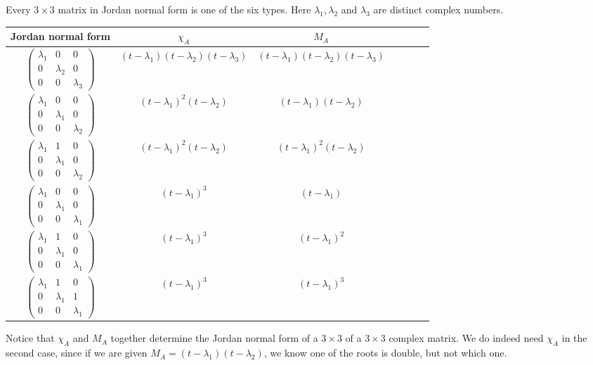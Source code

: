 \documentclass[a4paper]{article}
\begin{document}
\begin{eg}
  Every $3\times 3$ matrix in Jordan normal form is one of the six types. Here $\lambda_1, \lambda_2$ and $\lambda_3$ are distinct complex numbers.
  \begin{center}
    \begin{tabular}{ccccccc}
      \toprule
      Jordan normal form & $\chi_A$ & $M_A$\\
      \midrule
      $\begin{pmatrix} \lambda_1 & 0 & 0\\ 0 & \lambda_2 & 0\\ 0 & 0 & \lambda_3 \end{pmatrix}$ & $(t - \lambda_1)(t - \lambda_2)(t- \lambda_3)$ & $(t - \lambda_1)(t - \lambda_2)(t- \lambda_3)$\\\addlinespace
      $\begin{pmatrix} \lambda_1 & 0 & 0\\ 0 & \lambda_1 & 0\\ 0 & 0 & \lambda_2 \end{pmatrix}$ & $(t - \lambda_1)^2 (t - \lambda_2)$ & $(t - \lambda_1) (t - \lambda_2)$\\\addlinespace
      $\begin{pmatrix} \lambda_1 & 1 & 0\\ 0 & \lambda_1 & 0\\ 0 & 0 & \lambda_2 \end{pmatrix}$ & $(t - \lambda_1)^2 (t - \lambda_2)$ & $(t - \lambda_1)^2 (t - \lambda_2)$\\\addlinespace
      $\begin{pmatrix} \lambda_1 & 0 & 0\\ 0 & \lambda_1 & 0\\ 0 & 0 & \lambda_1 \end{pmatrix}$ & $(t - \lambda_1)^3$ & $(t - \lambda_1)$\\\addlinespace
      $\begin{pmatrix} \lambda_1 & 1 & 0\\ 0 & \lambda_1 & 0\\ 0 & 0 & \lambda_1 \end{pmatrix}$ & $(t - \lambda_1)^3$ & $(t - \lambda_1)^2$\\\addlinespace
      $\begin{pmatrix} \lambda_1 & 1 & 0\\ 0 & \lambda_1 & 1\\ 0 & 0 & \lambda_1 \end{pmatrix}$ & $(t - \lambda_1)^3$ & $(t - \lambda_1)^3$\\
      \bottomrule
    \end{tabular}
  \end{center}
  Notice that $\chi_A$ and $M_A$ together determine the Jordan normal form of a $3\times 3$ of a $3\times 3$ complex matrix. We do indeed need $\chi_A$ in the second case, since if we are given $M_A = (t - \lambda_1)(t - \lambda_2)$, we know one of the roots is double, but not which one.
\end{eg}
\end{document}
